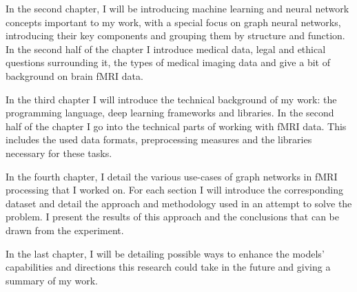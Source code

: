 In the second chapter, I will be introducing machine learning and neural network concepts important to my work, with a special focus on graph neural networks, introducing their key components and grouping them by structure and function. In the second half of the chapter I introduce medical data, legal and ethical questions surrounding it, the types of medical imaging data and give a bit of background on brain fMRI data.

In the third chapter I will introduce the technical background of my work: the programming language, deep learning frameworks and libraries. In the second half of the chapter I go into the technical parts of working with fMRI data. This includes the used data formats, preprocessing measures and the libraries necessary for these tasks.

In the fourth chapter, I detail the various use-cases of graph networks in fMRI processing that I worked on. For each section I will introduce the corresponding dataset and detail the approach and methodology used in an attempt to solve the problem. I present the results of this approach and the conclusions that can be drawn from the experiment.

In the last chapter, I will be detailing possible ways to enhance the models’ capabilities and directions this research could take in the future and giving a summary of my work.